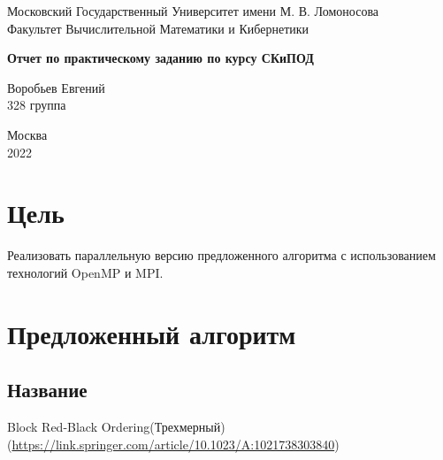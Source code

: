 \documentclass[a4paper,12pt,titlepage,final]{article}
\begin{document}
\begin{titlepage}
    \begin{center}
    {\small \sc Московский Государственный Университет имени М. В. Ломоносова \\
    Факультет Вычислительной Математики и Кибернетики\\}
    \vfill
    
    {\large \bf Отчет по практическому заданию по курсу СКиПОД\\}
    \end{center}
    \begin{flushright}
    \vfill {
    Воробьев Евгений\\
    328 группа\\
    }
    \end{flushright}
    \begin{center}
    \vfill
    {\small Москва\\2022}
    \end{center}
    \par
\end{titlepage}

\tableofcontents

\newpage
\section{Цель}
Реализовать параллельную версию предложенного алгоритма с использованием технологий OpenMP и MPI.

\section{Предложенный алгоритм}\par
\subsection{Название}
Block Red-Black Ordering(Трехмерный)(\url{https://link.springer.com/article/10.1023/A:1021738303840})
\end{document}
